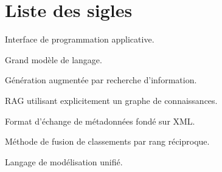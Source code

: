 \chapter*{Liste des sigles}
\begin{description}[leftmargin=3.5cm,style=nextline]
  \item[API] Interface de programmation applicative.
  \item[LLM] Grand modèle de langage.
  \item[RAG] Génération augmentée par recherche d'information.
  \item[GraphRAG] RAG utilisant explicitement un graphe de connaissances.
  \item[XMI] Format d'échange de métadonnées fondé sur XML.
  \item[RRF] Méthode de fusion de classements par rang réciproque.
  \item[UML] Langage de modélisation unifié.
\end{description}
